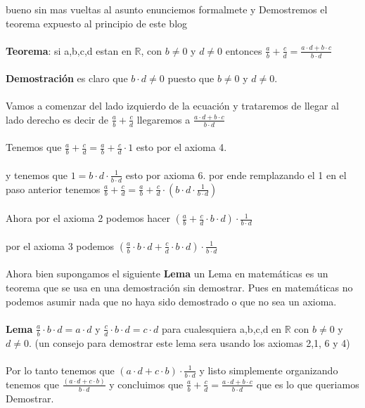 \documentclass{article}
\begin{document}
bueno sin mas vueltas al asunto enunciemos formalmete y Demostremos el teorema expuesto al principio de este blog \\ \\ 
\textbf{Teorema}: si a,b,c,d estan en $\mathbb R$, con $b \not = 0$ y $d \not = 0$ entonces $\frac{a}{b}+\frac{c}{d}=\frac{a \cdot d + b \cdot c}{b \cdot d}$
\\ \\
\textbf{Demostración} es claro que $b \cdot d \not = 0$ puesto que $b \not = 0$ y $d \not = 0$.
\\ \\ 
Vamos a comenzar del lado izquierdo de la ecuación y trataremos de llegar al lado derecho es decir de $\frac{a}{b}+\frac{c}{d}$
llegaremos a $\frac{a \cdot d + b \cdot c}{b \cdot d}$
\\ \\
Tenemos que $\frac{a}{b}+\frac{c}{d}= \frac{a}{b}+\frac{c}{d} \cdot 1$ esto por el axioma 4.
\\ \\
y tenemos que $1 = b \cdot d \cdot \frac{1}{b \cdot d}$ esto por axioma 6. por ende remplazando el 1 en el paso anterior tenemos
$\frac{a}{b}+\frac{c}{d}= \frac{a}{b}+\frac{c}{d} \cdot (b \cdot d \cdot \frac{1}{b \cdot d}) $ 
\\ \\ 
Ahora por el axioma 2 podemos hacer $(\frac{a}{b}+\frac{c}{d} \cdot b \cdot d )\cdot \frac{1}{b \cdot d}$
\\ \\ 
por el axioma 3 podemos $(\frac{a}{b}\cdot b \cdot d + \frac{c}{d} \cdot b \cdot d) \cdot \frac{1}{b \cdot d}$
\\ \\ 
Ahora bien supongamos el siguiente \textbf{Lema} un Lema en matemáticas es un teorema que se usa en una demostración sin 
demostrar. Pues en matemáticas no podemos asumir nada que no haya sido demostrado o que no sea un axioma.
\\ \\ 
\textbf{Lema} $\frac{a}{b}\cdot b \cdot d = a \cdot d $  y $\frac{c}{d} \cdot b \cdot d = c \cdot d$ para cualesquiera a,b,c,d en $\mathbb R$
con $b \not = 0$ y $d \not = 0$. (un consejo para demostrar este lema sera usando los axiomas 2,1, 6 y 4)
\\ \\ Por lo tanto tenemos que $(a \cdot d + c \cdot b) \cdot \frac{1}{b \cdot d}$ y listo simplemente organizando tenemos que $\frac{(a \cdot d + c \cdot b)}{b \cdot d} $
y concluimos que $\frac{a}{b}+\frac{c}{d}=\frac{a \cdot d + b \cdot c}{b \cdot d}$ que es lo que queriamos Demostrar.
\end{document}
